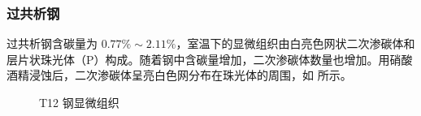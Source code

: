     \subsubsection{过共析钢}
    过共析钢含碳量为 $0.77\%\sim 2.11\%$，室温下的显微组织由白亮色网状二次渗碳体和层片状珠光体（P）构成。随着钢中含碳量增加，二次渗碳体数量也增加。用硝酸酒精浸蚀后，二次渗碳体呈亮白色网分布在珠光体的周围，如 所示。
    \begin{figure}[!ht]
        \hspace{20pt}
        \hspace{20pt}
        \caption{T12 钢显微组织\label{fig:n4}}
    \end{figure}


